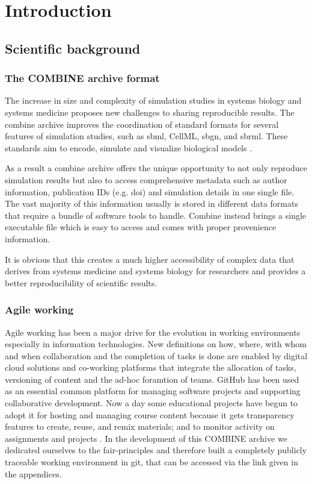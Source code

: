 \section*{Introduction}


\subsection*{Scientific background}
\subsubsection*{The COMBINE archive format}
The increase in size and complexity of simulation studies in systems biology and systems medicine proposes new challenges to sharing reproducible results. The \ac{combine} archive improves the coordination of standard formats for several features of simulation studies, such as \ac{sbml}, CellML, \ac{sbgn}, and \ac{sbrml}. These standards aim to encode, simulate and visualize biological models \cite{combine}. 

As a result a \ac{combine} archive offers the unique opportunity to not only reproduce simulation results but also to access comprehensive metadata such as author information, publication IDs (e.g. \ac{doi}) and simulation details in one single file. The vast majority of this information usually  is stored in different data formats that require a bundle of software tools to handle. Combine instead brings a single executable file which is easy to access and comes with proper provenience information.

It is obvious that this creates a much higher accessibility of complex data that derives from systems medicine and systems biology for researchers and provides a better reproducibility of scientific results.

\subsubsection*{Agile working}
Agile working has been a major drive for the evolution in working environments especially in information technologies. New definitions on how, where, with whom and when collaboration and the completion of tasks is done are enabled by digital cloud solutions and co-working platforms that integrate the allocation of tasks, versioning of content and the ad-hoc foramtion of teams. GitHub has been used as an essential common platform for managing software projects and supporting collaborative development. Now a day some educational projects have begun to adopt it for hosting and managing course content because it gets transparency features to create, reuse, and remix materials; and to monitor activity on assignments and projects \cite{github}. In the development of this COMBINE archive we dedicated ourselves to the \acs{fair}-principles and therefore built a completely publicly traceable working environment in git, that can be accessed via the link given in the appendices.




